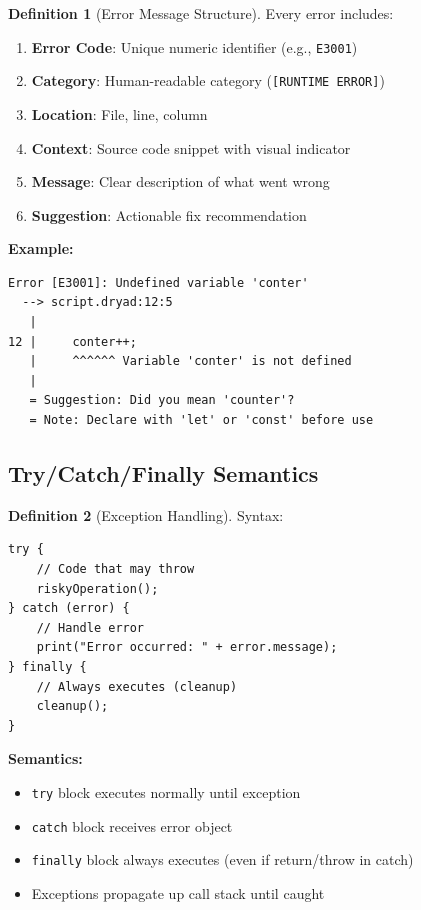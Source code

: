 \documentclass[12pt,a4paper]{article}
\theoremstyle{definition}
\newtheorem{definition}{Definition}[section]
\begin{document}
\begin{definition}[Error Message Structure]
Every error includes:
\begin{enumerate}[leftmargin=*]
    \item \textbf{Error Code}: Unique numeric identifier (e.g., \texttt{E3001})
    \item \textbf{Category}: Human-readable category (\texttt{[RUNTIME ERROR]})
    \item \textbf{Location}: File, line, column
    \item \textbf{Context}: Source code snippet with visual indicator
    \item \textbf{Message}: Clear description of what went wrong
    \item \textbf{Suggestion}: Actionable fix recommendation
\end{enumerate}

\textbf{Example:}
\begin{verbatim}
Error [E3001]: Undefined variable 'conter'
  --> script.dryad:12:5
   |
12 |     conter++;
   |     ^^^^^^ Variable 'conter' is not defined
   |
   = Suggestion: Did you mean 'counter'?
   = Note: Declare with 'let' or 'const' before use
\end{verbatim}
\end{definition}

\subsection{Try/Catch/Finally Semantics}

\begin{definition}[Exception Handling]
Syntax:
\begin{lstlisting}[language=Dryad]
try {
    // Code that may throw
    riskyOperation();
} catch (error) {
    // Handle error
    print("Error occurred: " + error.message);
} finally {
    // Always executes (cleanup)
    cleanup();
}
\end{lstlisting}

\textbf{Semantics:}
\begin{itemize}[leftmargin=*]
    \item \texttt{try} block executes normally until exception
    \item \texttt{catch} block receives error object
    \item \texttt{finally} block always executes (even if return/throw in catch)
    \item Exceptions propagate up call stack until caught
\end{itemize}
\end{definition}
\end{document}
